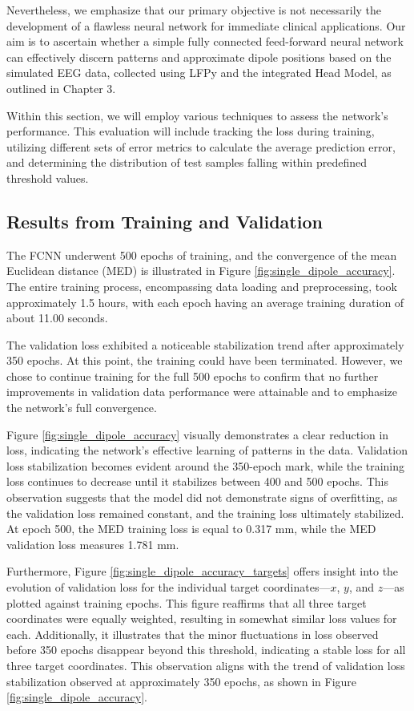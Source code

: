 \documentclass[a4paper, UKenglish, 11pt]{uiomaster}
\begin{document}
Nevertheless, we emphasize that our primary objective is not necessarily the development of a flawless neural network for immediate clinical applications. Our aim is to ascertain whether a simple fully connected feed-forward neural network can effectively discern patterns and approximate dipole positions based on the simulated EEG data, collected using LFPy and the integrated Head Model, as outlined in Chapter 3.

Within this section, we will employ various techniques to assess the network's performance. This evaluation will include tracking the loss during training, utilizing different sets of error metrics to calculate the average prediction error, and determining the distribution of test samples falling within predefined threshold values.

\subsection{Results from Training and Validation}
The FCNN underwent 500 epochs of training, and the convergence of the mean Euclidean distance (MED) is illustrated in Figure \ref{fig:single_dipole_accuracy}. The entire training process, encompassing data loading and preprocessing, took approximately 1.5 hours, with each epoch having an average training duration of about 11.00 seconds.

The validation loss exhibited a noticeable stabilization trend after approximately 350 epochs. At this point, the training could have been terminated. However, we chose to continue training for the full 500 epochs to confirm that no further improvements in validation data performance were attainable and to emphasize the network's full convergence.

Figure \ref{fig:single_dipole_accuracy} visually demonstrates a clear reduction in loss, indicating the network's effective learning of patterns in the data. Validation loss stabilization becomes evident around the 350-epoch mark, while the training loss continues to decrease until it stabilizes between 400 and 500 epochs. This observation suggests that the model did not demonstrate signs of overfitting, as the validation loss remained constant, and the training loss ultimately stabilized. At epoch 500, the MED training loss is equal to 0.317 mm, while the MED validation loss measures 1.781 mm.

Furthermore, Figure \ref{fig:single_dipole_accuracy_targets} offers insight into the evolution of validation loss for the individual target coordinates—$x$, $y$, and $z$—as plotted against training epochs. This figure reaffirms that all three target coordinates were equally weighted, resulting in somewhat similar loss values for each. Additionally, it illustrates that the minor fluctuations in loss observed before 350 epochs disappear beyond this threshold, indicating a stable loss for all three target coordinates. This observation aligns with the trend of validation loss stabilization observed at approximately 350 epochs, as shown in Figure \ref{fig:single_dipole_accuracy}.
\end{document}
